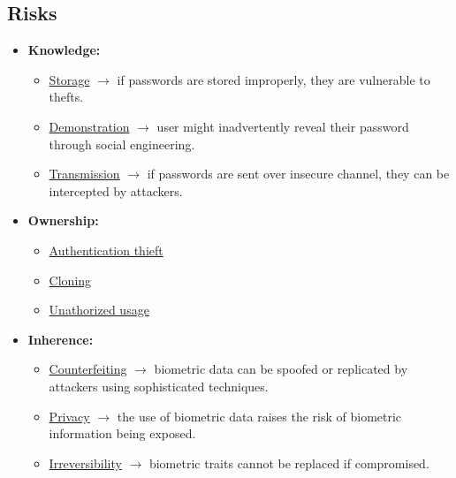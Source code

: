 \subsection{Risks}
\begin{itemize}
    \item \textbf{Knowledge:}
    \begin{itemize}
        \item \underline{Storage} \(\rightarrow \) if passwords are stored improperly, they are vulnerable to thefts. 
        \item \underline{Demonstration} \(\rightarrow\) user might inadvertently reveal their password through social engineering.
        \item \underline{Transmission} \(\rightarrow\) if passwords are sent over insecure channel, they can be intercepted by attackers. 
    \end{itemize}
    \item \textbf{Ownership:}
    \begin{itemize}
        \item \underline{Authentication thieft}
        \item \underline{Cloning}
        \item \underline{Unathorized usage}
    \end{itemize}
    \item \textbf{Inherence:}
    \begin{itemize}
        \item \underline{Counterfeiting} \(\rightarrow\) biometric data can be spoofed or replicated by attackers using sophisticated techniques.
        \item \underline{Privacy} \(\rightarrow\) the use of biometric data raises the risk of biometric information being exposed.
        \item \underline{Irreversibility} \(\rightarrow\) biometric traits cannot be replaced if compromised. 
    \end{itemize}
\end{itemize}

